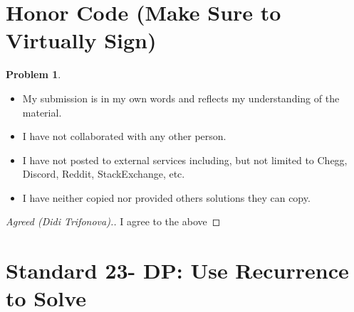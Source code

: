 \documentclass[11pt]{article}
\theoremstyle{definition}
\theoremstyle{definition}
\newtheorem{required}{Problem}
\theoremstyle{definition}
\begin{document}

\section{Honor Code (Make Sure to Virtually Sign)} \label{HonorCode}

\begin{required}
\noindent 
\begin{itemize}
\item My submission is in my own words and reflects my understanding of the material.
\item I have not collaborated with any other person.
\item I have not posted to external services including, but not limited to Chegg, Discord, Reddit, StackExchange, etc.
\item I have neither copied nor provided others solutions they can copy.
\end{itemize}

\end{required}

\begin{proof}[Agreed (Didi Trifonova).]
I agree to the above
\end{proof}


\newpage
\section{Standard 23- DP: Use Recurrence to Solve}
\end{document}
